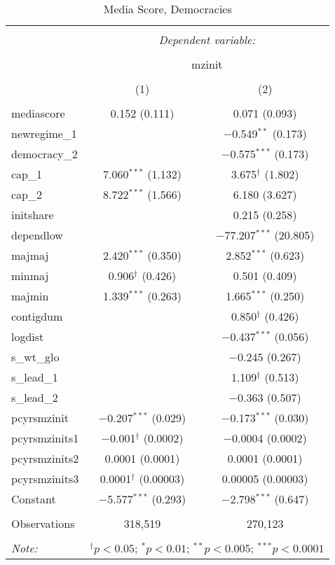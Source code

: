 
\begin{table}[!htbp] \centering 
  \caption{Media Score, Democracies} 
  \label{} 
\begin{tabular}{@{\extracolsep{5pt}}lcc} 
\\[-1.8ex]\hline 
\hline \\[-1.8ex] 
 & \multicolumn{2}{c}{\textit{Dependent variable:}} \\ 
\cline{2-3} 
\\[-1.8ex] & \multicolumn{2}{c}{mzinit} \\ 
\\[-1.8ex] & (1) & (2)\\ 
\hline \\[-1.8ex] 
 mediascore & 0.152 (0.111) & 0.071 (0.093) \\ 
  newregime\_1 &  & $-$0.549$^{**}$ (0.173) \\ 
  democracy\_2 &  & $-$0.575$^{***}$ (0.173) \\ 
  cap\_1 & 7.060$^{***}$ (1.132) & 3.675$^{\dagger}$ (1.802) \\ 
  cap\_2 & 8.722$^{***}$ (1.566) & 6.180 (3.627) \\ 
  initshare &  & 0.215 (0.258) \\ 
  dependlow &  & $-$77.207$^{***}$ (20.805) \\ 
  majmaj & 2.420$^{***}$ (0.350) & 2.852$^{***}$ (0.623) \\ 
  minmaj & 0.906$^{\dagger}$ (0.426) & 0.501 (0.409) \\ 
  majmin & 1.339$^{***}$ (0.263) & 1.665$^{***}$ (0.250) \\ 
  contigdum &  & 0.850$^{\dagger}$ (0.426) \\ 
  logdist &  & $-$0.437$^{***}$ (0.056) \\ 
  s\_wt\_glo &  & $-$0.245 (0.267) \\ 
  s\_lead\_1 &  & 1.109$^{\dagger}$ (0.513) \\ 
  s\_lead\_2 &  & $-$0.363 (0.507) \\ 
  pcyrsmzinit & $-$0.207$^{***}$ (0.029) & $-$0.173$^{***}$ (0.030) \\ 
  pcyrsmzinits1 & $-$0.001$^{\dagger}$ (0.0002) & $-$0.0004 (0.0002) \\ 
  pcyrsmzinits2 & 0.0001 (0.0001) & 0.0001 (0.0001) \\ 
  pcyrsmzinits3 & 0.0001$^{\dagger}$ (0.00003) & 0.00005 (0.00003) \\ 
  Constant & $-$5.577$^{***}$ (0.293) & $-$2.798$^{***}$ (0.647) \\ 
 \hline \\[-1.8ex] 
Observations & 318,519 & 270,123 \\ 
\hline 
\hline \\[-1.8ex] 
\textit{Note:}  & \multicolumn{2}{r}{$^{\dagger} p<0.05$; $^{*} p<0.01$; $^{**} p<0.005$; $^{***} p<0.0001$} \\ 
\end{tabular} 
\end{table} 
